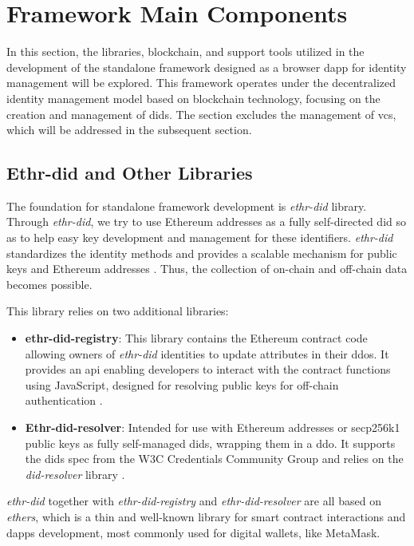 \section{Framework Main Components}

In this section, the libraries, blockchain, and support tools utilized in the development of the standalone framework designed as a browser \gls{dapp} for 
identity management will be explored. This framework operates under the decentralized identity management model based on blockchain technology, focusing on the creation and 
management of \gls{did}s. The section excludes the management of \gls{vc}s, which will be addressed in the subsequent section.

\subsection{Ethr-did and Other Libraries}

The foundation for standalone framework development is \textit{ethr-did} library. Through \textit{ethr-did}, we try to use Ethereum addresses as a fully self-directed \gls{did} 
so as to help easy key development and management for these identifiers. \textit{ethr-did} standardizes the identity methods and provides a scalable mechanism for 
public keys and Ethereum addresses \cite{ethr-did}. Thus, the collection of on-chain and off-chain data becomes possible. 

This library relies on two additional libraries: 

\begin{itemize}
  \item \textbf{ethr-did-registry}: This library contains the Ethereum contract code allowing owners of \textit{ethr-did} identities to update attributes in their \gls{ddo}s. 
  It provides an \gls{api} enabling developers to interact with the contract functions using JavaScript, designed for resolving public keys for off-chain authentication \cite{ethr-did-registry}.
  \item \textbf{Ethr-did-resolver}: Intended for use with Ethereum addresses or secp256k1 public keys as fully self-managed \gls{did}s, wrapping them in a \gls{ddo}. It 
  supports the \gls{did}s spec from the W3C Credentials Community Group and relies on the \textit{did-resolver} library \cite{ethr-did-resolver}.
\end{itemize}

\textit{ethr-did} together with \textit{ethr-did-registry} and \textit{ethr-did-resolver} are all based on \textit{ethers}, which is a thin and well-known library for smart contract interactions and 
\gls{dapp}s development, most commonly used for digital wallets, like MetaMask.

